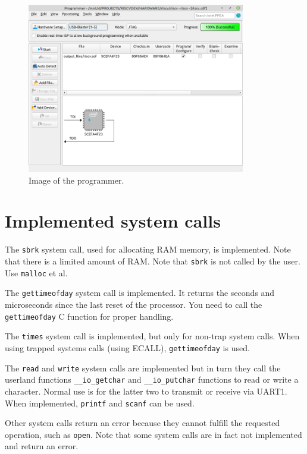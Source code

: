 \documentclass[12pt]{article}
\begin{document}
\begin{itemize}
\begin{figure}[!ht]
\centering
\includegraphics[width=0.85\textwidth]{programmer}
\caption{Image of the programmer.}
\label{programmer}
\end{figure}

\end{itemize}

\section{Implemented system calls}
The \lstinline|sbrk| system call, used for allocating RAM memory, is implemented. Note that there is a limited amount of RAM. Note that \lstinline|sbrk| is not called by the user. Use \lstinline|malloc| et al.

The \lstinline|gettimeofday| system call is implemented. It returns the seconds and microseconds since the last reset of the processor. You need to call the \lstinline|gettimeofday| C function for proper handling. %

The \lstinline|times| system call is implemented, but only for non-trap system calls. When using trapped systems calls (using ECALL), \lstinline|gettimeofday| is used.

The \lstinline|read| and \lstinline|write| system calls are implemented but in turn they call the userland functions \lstinline|__io_getchar| and \lstinline|__io_putchar| functions to read or write a character. Normal use is for the latter two to transmit or receive via UART1. When implemented, \lstinline|printf| and \lstinline|scanf| can be used.

Other system calls return an error because they cannot fulfill the requested operation, such as \lstinline|open|. Note that some system calls are in fact not implemented and return an error.
\end{document}

